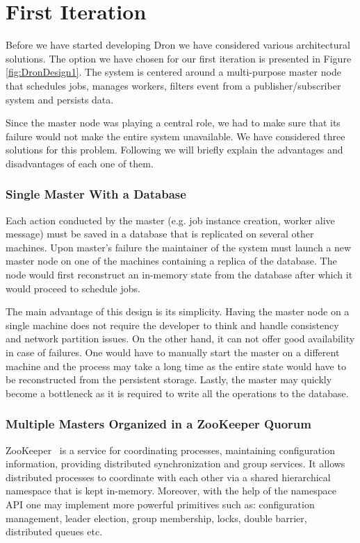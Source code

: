 \documentclass[11pt,a4paper,twoside]{report}
\begin{document}
\section{First Iteration}
Before we have started developing Dron we have considered various architectural solutions. The option we have chosen for our first iteration is presented in Figure \ref{fig:DronDesign1}. The system is centered around a multi-purpose master node that schedules jobs, manages workers, filters event from a publisher/subscriber system and persists data.


Since the master node was playing a central role, we had to make sure that its failure would not make the entire system unavailable. We have considered three solutions for this problem. Following we will briefly explain the advantages and disadvantages of each one of them.

\subsubsection{Single Master With a Database}
Each action conducted by the master (e.g. job instance creation, worker alive message) must be saved in a database that is replicated on several other machines. Upon master's failure the maintainer of the system must launch a new master node on one of the machines containing a replica of the database. The node would first reconstruct an in-memory state from the database after which it would proceed to schedule jobs.


The main advantage of this design is its simplicity. Having the master node on a single machine does not require the developer to think and handle consistency and network partition issues. On the other hand, it can not offer good availability in case of failures. One would have to manually start the master on a different machine and the process may take a long time as the entire state would have to be reconstructed from the persistent storage. Lastly, the master may quickly become a bottleneck as it is required to write all the operations to the database.

\subsubsection{Multiple Masters Organized in a ZooKeeper Quorum}
ZooKeeper~\cite{Zookeeper} is a service for coordinating processes, maintaining configuration information, providing distributed synchronization and group services. It allows distributed processes to coordinate with each other via a shared hierarchical namespace that is kept in-memory. Moreover, with the help of the namespace API one may implement more powerful primitives such as: configuration management, leader election, group membership, locks, double barrier, distributed queues etc.
\end{document}
